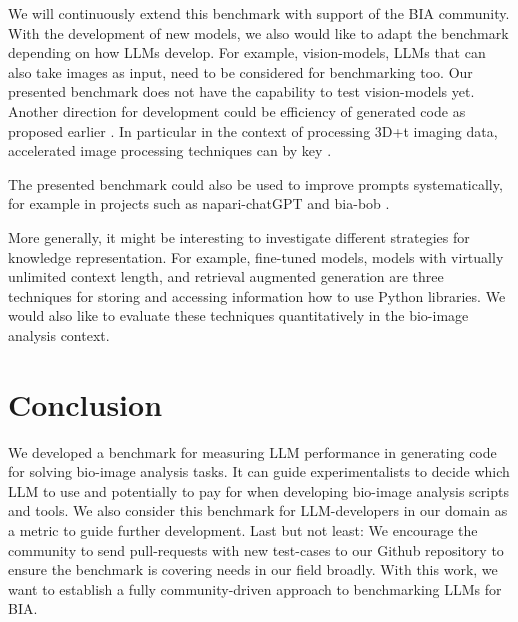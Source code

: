 \documentclass{ecai}
\begin{document}
We will continuously extend this benchmark with support of the BIA community. With the development of new models, we also would like to adapt the benchmark depending on how LLMs develop. For example, vision-models, LLMs that can also take images as input, need to be considered for benchmarking too. Our presented benchmark does not have the capability to test vision-models yet. Another direction for development could be efficiency of generated code as proposed earlier \citep{du2024mercury}. In particular in the context of processing 3D+t imaging data, accelerated image processing techniques can by key \citep{Haase2020}. 
\begin{blind}
The presented benchmark could also be used to improve prompts systematically, for example in projects such as napari-chatGPT \citep{royer2023omega} and bia-bob \citep{haase2024biaBob}.
\end{blind} 
More generally, it might be interesting to investigate different strategies for knowledge representation. For example, fine-tuned models, models with virtually unlimited context length, and retrieval augmented generation are three techniques for storing and accessing information how to use Python libraries. We would also like to evaluate these techniques quantitatively in the bio-image analysis context.


\section{Conclusion}

We developed a benchmark for measuring LLM performance in generating code for solving bio-image analysis tasks. It can guide experimentalists to decide which LLM to use and potentially to pay for when developing bio-image analysis scripts and tools. We also consider this benchmark for LLM-developers in our domain as a metric to guide further development. Last but not least: We encourage the community to send pull-requests with new test-cases to our Github repository to ensure the benchmark is covering needs in our field broadly. With this work, we want to establish a fully community-driven approach to benchmarking LLMs for BIA. 



\end{document}
